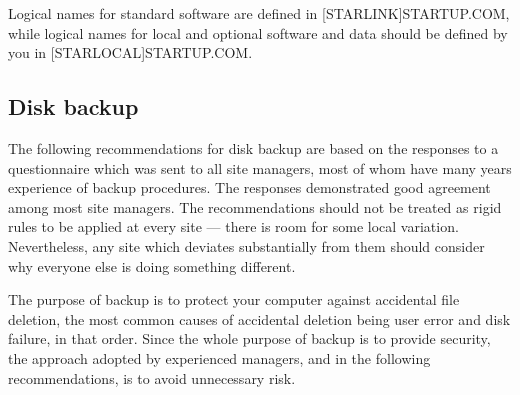 Logical names for standard software are defined in [STARLINK]STARTUP.COM, while
logical names for local and optional software and data should be defined by
you in [STARLOCAL]STARTUP.COM.

\subsection {Disk backup}

The following recommendations for disk backup are based on the responses to a
questionnaire which was sent to all site managers, most of whom have many years
experience of backup procedures.
The responses demonstrated good agreement among most site managers.
The recommendations should not be treated as rigid rules to be applied at every
site --- there is room for some local variation.
Nevertheless, any site which deviates substantially from them should consider
why everyone else is doing something different.
 
The purpose of backup is to protect your computer against accidental file
deletion, the most common causes of accidental deletion being user error and
disk failure, in that order.
Since the whole purpose of backup is to provide security, the approach adopted
by experienced managers, and in the following recommendations, is to avoid
unnecessary risk.
 
